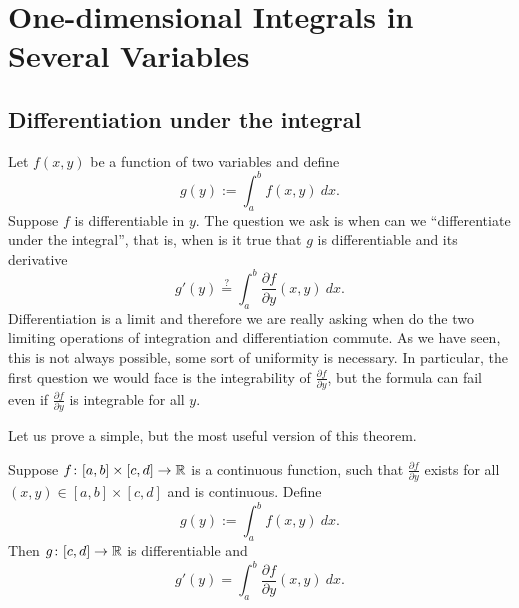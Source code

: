 \chapter{One-dimensional Integrals in Several Variables} \label{path:chapter}


\section{Differentiation under the integral}
\label{sec:diffunderint}


Let $f(x,y)$ be a function of two variables and define
\begin{equation*}
g(y) := \int_a^b f(x,y) ~dx .
\end{equation*}
Suppose $f$ is differentiable in $y$.  The question we ask is
when can we ``differentiate under the integral'', that is,
when is it true that $g$ is differentiable and its derivative
\begin{equation*}
g'(y) \overset{?}{=} \int_a^b \frac{\partial f}{\partial y}(x,y) ~dx .
\end{equation*}
Differentiation is a limit and therefore we are really asking when do the
two limiting operations of integration and differentiation commute.
As we have seen, this is not always possible, some sort of uniformity is
necessary.  In particular, the first
question we would face is the integrability of
$\frac{\partial f}{\partial y}$, but the formula can fail even if
$\frac{\partial f}{\partial y}$ is integrable for all $y$.

Let us prove a simple, but the most useful version of this theorem.

\begin{thm}
Suppose $f \colon [a,b] \times [c,d] \to {\mathbb{R}}$ is a continuous function,
such that $\frac{\partial f}{\partial y}$ exists for all $(x,y) \in [a,b]
\times [c,d]$ and is continuous.  Define
\begin{equation*}
g(y) := \int_a^b f(x,y) ~dx .
\end{equation*}
Then $g \colon [c,d] \to {\mathbb{R}}$ is differentiable and
\begin{equation*}
g'(y) = \int_a^b \frac{\partial f}{\partial y}(x,y) ~dx .
\end{equation*}
\end{thm}

